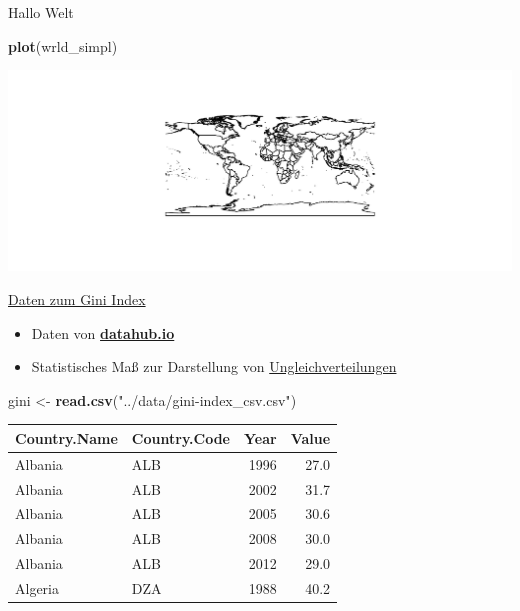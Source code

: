 \documentclass[ignorenonframetext,]{beamer}
\newenvironment{Shaded}{\begin{snugshade}}{\end{snugshade}}
\newcommand{\KeywordTok}[1]{\textcolor[rgb]{0.13,0.29,0.53}{\textbf{#1}}}
\newcommand{\StringTok}[1]{\textcolor[rgb]{0.31,0.60,0.02}{#1}}
\newcommand{\NormalTok}[1]{#1}
\providecommand{\tightlist}{%
  \setlength{\itemsep}{0pt}\setlength{\parskip}{0pt}}
\begin{document}
\begin{frame}[fragile]{Hallo Welt}

\begin{Shaded}
\begin{Highlighting}[]
\KeywordTok{plot}\NormalTok{(wrld_simpl)}
\end{Highlighting}
\end{Shaded}

\includegraphics{Choroplethen_files/figure-beamer/unnamed-chunk-4-1.pdf}

\end{frame}

\begin{frame}[fragile]{\href{https://datahub.io/core/gini-index\#data}{Daten
zum Gini Index}}

\begin{itemize}
\tightlist
\item
  Daten von
  \href{https://datahub.io/core/gini-index\#data}{\textbf{datahub.io}}
\item
  Statistisches Maß zur Darstellung von
  \href{https://de.wikipedia.org/wiki/Gini-Koeffizient}{Ungleichverteilungen}
\end{itemize}

\begin{Shaded}
\begin{Highlighting}[]
\NormalTok{gini <-}\StringTok{ }\KeywordTok{read.csv}\NormalTok{(}\StringTok{"../data/gini-index_csv.csv"}\NormalTok{)}
\end{Highlighting}
\end{Shaded}

\begin{longtable}[]{@{}llrr@{}}
\toprule
Country.Name & Country.Code & Year & Value\tabularnewline
\midrule
\endhead
Albania & ALB & 1996 & 27.0\tabularnewline
Albania & ALB & 2002 & 31.7\tabularnewline
Albania & ALB & 2005 & 30.6\tabularnewline
Albania & ALB & 2008 & 30.0\tabularnewline
Albania & ALB & 2012 & 29.0\tabularnewline
Algeria & DZA & 1988 & 40.2\tabularnewline
\bottomrule
\end{longtable}

\end{frame}
\end{document}
